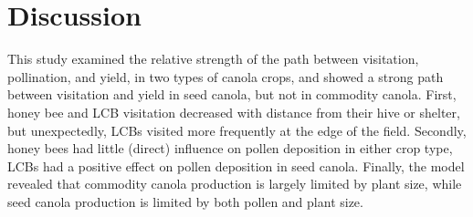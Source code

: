 \documentclass[12pt]{article} %
\begin{document}
% 

\section{Discussion}
This study examined the relative strength of the path between visitation, pollination, and yield, in two types of canola crops, and showed a strong path between visitation and yield in seed canola, but not in commodity canola.
First, honey bee and LCB visitation decreased with distance from their hive or shelter, but unexpectedly, LCBs visited more frequently at the edge of the field.
Secondly, honey bees had little (direct) influence on pollen deposition in either crop type, LCBs had a positive effect on pollen deposition in seed canola.
Finally, the model revealed that commodity canola production is largely limited by plant size, while seed canola production is limited by both pollen and plant size.
\end{document}
